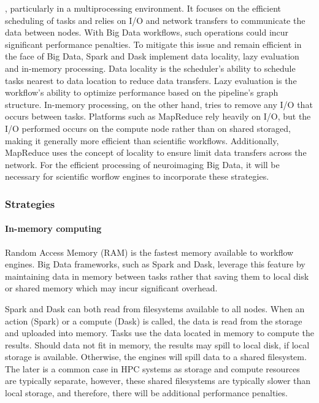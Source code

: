             
            , 
            particularly in a multiprocessing environment. It focuses on the 
            efficient 
            scheduling of tasks and relies on I/O and network transfers to
            communicate the data between nodes. With Big Data workflows, such
            operations could incur significant performance penalties. 
            To mitigate this issue and remain efficient in the face of
            Big Data, Spark and Dask implement data locality, lazy evaluation 
            and in-memory processing. Data locality is the scheduler's ability
            to schedule tasks nearest to data location to reduce data transfers.
            Lazy evaluation is the workflow's ability to optimize performance
            based on the pipeline's graph structure. In-memory processing, on 
            the other hand, tries to remove any I/O that occurs between tasks. 
            Platforms such as MapReduce rely heavily 
            on I/O, but the 
            I/O performed occurs on the compute node rather than on 
            shared storaged, making it generally more efficient than scientific
            workflows. Additionally, MapReduce uses the concept of 
            locality to ensure limit data transfers across the network.
            For the efficient processing of neuroimaging Big Data, it will be
            necessary for scientific worflow engines to incorporate these 
            strategies.
        

            \subsubsection{Strategies}
                \paragraph{In-memory computing}
                    Random Access Memory (RAM) is the fastest memory available
                    to workflow engines. Big Data frameworks, such as Spark and 
                    Dask, leverage this feature by maintaining data in memory 
                    between tasks rather that saving them to local disk or 
                    shared memory which may incur significant overhead.

                    Spark and Dask can both read from filesystems available to
                    all nodes. When an action (Spark) or a compute (Dask) is 
                    called, the data is read from the storage and uploaded into
                    memory. Tasks use the data located in memory to compute the
                    results. Should data not fit in memory, the results may 
                    spill to local disk, if local storage is available. 
                    Otherwise, the engines will spill data to a shared 
                    filesystem. The later is a common case in HPC systems as 
                    storage and compute resources are typically separate, 
                    however, these shared filesystems are typically slower than 
                    local storage, and therefore, there will be additional 
                    performance penalties.

